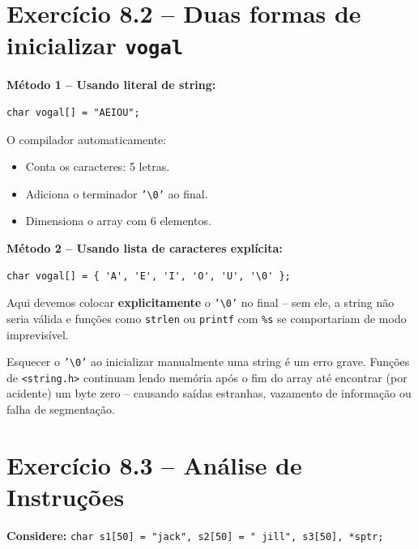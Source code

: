 \documentclass[12pt,a4paper]{article}
\begin{document}
\newpage

\section{Exercício 8.2 -- Duas formas de inicializar \texttt{vogal}}

\begin{respostabox}
\textbf{Método 1 -- Usando literal de string:}
\begin{lstlisting}
char vogal[] = "AEIOU";
\end{lstlisting}
O compilador automaticamente:
\begin{itemize}[noitemsep]
  \item Conta os caracteres: 5 letras.
  \item Adiciona o terminador \texttt{'\textbackslash 0'} ao final.
  \item Dimensiona o array com 6 elementos.
\end{itemize}

\textbf{Método 2 -- Usando lista de caracteres explícita:}
\begin{lstlisting}
char vogal[] = { 'A', 'E', 'I', 'O', 'U', '\0' };
\end{lstlisting}
Aqui devemos colocar \textbf{explicitamente} o \texttt{'\textbackslash 0'} no final --
sem ele, a string não seria válida e funções como \texttt{strlen} ou \texttt{printf}
com \texttt{\%s} se comportariam de modo imprevisível.

\begin{erroco}
  Esquecer o \texttt{'\textbackslash 0'} ao inicializar manualmente uma string
  é um erro grave. Funções de \texttt{<string.h>} continuam lendo memória após
  o fim do array até encontrar (por acidente) um byte zero -- causando saídas
  estranhas, vazamento de informação ou falha de segmentação.
\end{erroco}
\end{respostabox}

\section{Exercício 8.3 -- Análise de Instruções}

\textbf{Considere:} \texttt{char s1[50] = "jack", s2[50] = " jill", s3[50], *sptr;}
\end{document}
